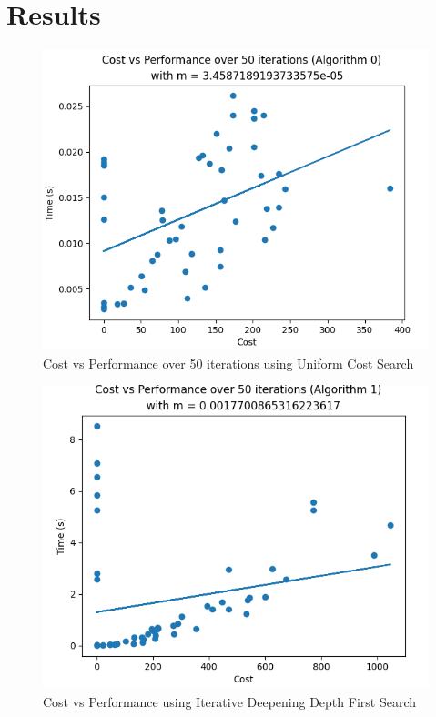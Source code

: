 \documentclass[a4paper]{article}
\begin{document}
\section*{{Results}}
\begin{figure}[ht]
    \centering
    \includegraphics[width=\textwidth]{CVPALG0.png}
    \caption{Cost vs Performance over 50 iterations using Uniform Cost Search}
    \label{fig:CostVsPerformanceAlg0}
\end{figure}
\newpage
\begin{figure}[ht]
    \centering
    \includegraphics[width=\textwidth]{CVPALG1.png}
    \caption{Cost vs Performance using Iterative Deepening Depth First Search}
    \label{fig:CostVsPerformanceAlg1}
\end{figure}
\end{document}
